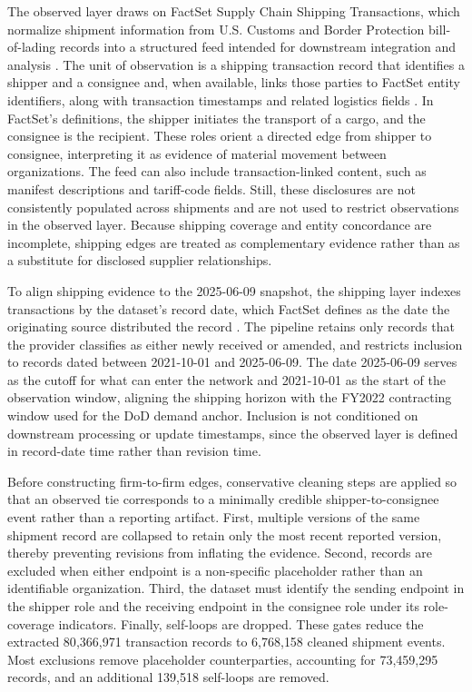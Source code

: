 The observed layer draws on FactSet Supply Chain Shipping Transactions, which normalize shipment information from U.S. Customs and Border Protection bill-of-lading records into a structured feed intended for downstream integration and analysis \parencite{factset_factset_2025}. The unit of observation is a shipping transaction record that identifies a shipper and a consignee and, when available, links those parties to FactSet entity identifiers, along with transaction timestamps and related logistics fields \parencite{factset_supply_2024}. In FactSet's definitions, the shipper initiates the transport of a cargo, and the consignee is the recipient. These roles orient a directed edge from shipper to consignee, interpreting it as evidence of material movement between organizations. The feed can also include transaction-linked content, such as manifest descriptions and tariff-code fields. Still, these disclosures are not consistently populated across shipments and are not used to restrict observations in the observed layer. Because shipping coverage and entity concordance are incomplete, shipping edges are treated as complementary evidence rather than as a substitute for disclosed supplier relationships.

To align shipping evidence to the 2025-06-09 snapshot, the shipping layer indexes transactions by the dataset's record date, which FactSet defines as the date the originating source distributed the record \parencite{factset_factset_2025}. The pipeline retains only records that the provider classifies as either newly received or amended, and restricts inclusion to records dated between 2021-10-01 and 2025-06-09. The date 2025-06-09 serves as the cutoff for what can enter the network and 2021-10-01 as the start of the observation window, aligning the shipping horizon with the FY2022 contracting window used for the DoD demand anchor. Inclusion is not conditioned on downstream processing or update timestamps, since the observed layer is defined in record-date time rather than revision time.

Before constructing firm-to-firm edges, conservative cleaning steps are applied so that an observed tie corresponds to a minimally credible shipper-to-consignee event rather than a reporting artifact. First, multiple versions of the same shipment record are collapsed to retain only the most recent reported version, thereby preventing revisions from inflating the evidence. Second, records are excluded when either endpoint is a non-specific placeholder rather than an identifiable organization. Third, the dataset must identify the sending endpoint in the shipper role and the receiving endpoint in the consignee role under its role-coverage indicators. Finally, self-loops are dropped. These gates reduce the extracted 80{,}366{,}971 transaction records to 6{,}768{,}158 cleaned shipment events. Most exclusions remove placeholder counterparties, accounting for 73{,}459{,}295 records, and an additional 139{,}518 self-loops are removed.

